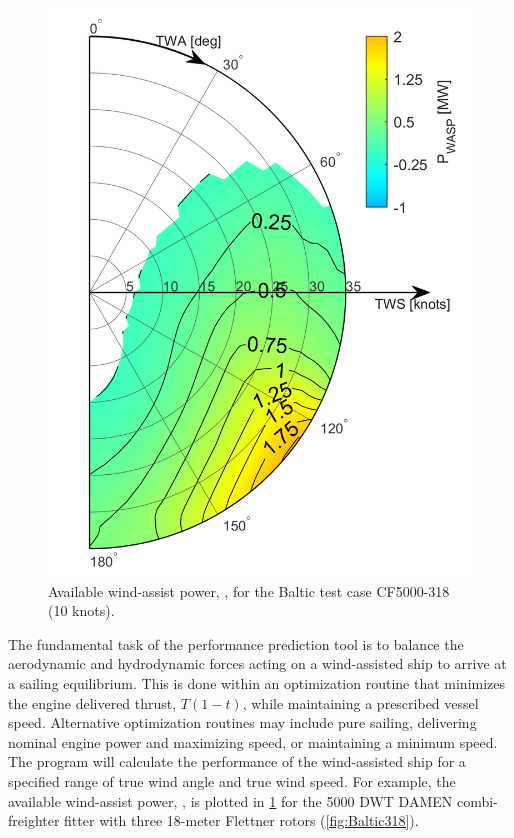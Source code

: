 \documentclass[twoside,twocolumn]{article}
\begin{document}
\begin{figure}[!th]
	\centering
	\includegraphics[width=\columnwidth]{images/P_Baltic224_10kts}
	\caption{Available wind-assist power, \PWASP, for the Baltic test case CF5000-318 (10 knots).}
	\label{fig:Pwasppolar}
\end{figure}

The fundamental task of the performance prediction tool is to balance the aerodynamic and hydrodynamic forces acting on a wind-assisted ship to arrive at a sailing equilibrium. This is done within an optimization routine that minimizes the engine delivered thrust, $T(1-t)$, while maintaining a prescribed vessel speed. Alternative optimization routines may include pure sailing, delivering nominal engine power and maximizing speed, or maintaining a minimum speed. The program will calculate the performance of the wind-assisted ship for a specified range of true wind angle and true wind speed. For example, the available wind-assist power, \PWASP, is plotted in \cref{fig:Pwasppolar} for the 5000 DWT DAMEN combi-freighter fitter with three 18-meter Flettner rotors (\cref{fig:Baltic318}). 
\end{document}
